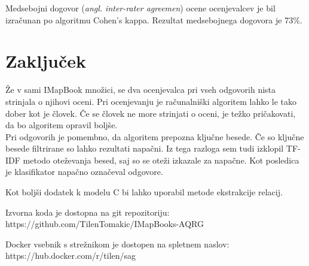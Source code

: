 \documentclass[journal]{IEEEtran}
\begin{document}
Medsebojni dogovor (\textit{angl. inter-rater agreemen}) ocene ocenjevalcev je bil izračunan po algoritmu Cohen's kappa. Rezultat medsebojnega dogovora je 73\%.

\section{Zaključek}
Že v sami IMapBook množici, se dva ocenjevalca pri vseh odgovorih nista strinjala o njihovi oceni. Pri ocenjevanju je računalniški algoritem lahko le tako dober kot je človek. Če se človek ne more strinjati o oceni, je težko pričakovati, da bo algoritem opravil boljše.\\

Pri odgovorih je pomembno, da algoritem prepozna ključne besede. Če so ključne besede filtrirane so lahko rezultati napačni. Iz tega razloga sem tudi izklopil TF-IDF metodo oteževanja besed, saj so se oteži izkazale za napačne. Kot posledica je klasifikator napačno označeval odgovore.

Kot boljši dodatek k modelu C bi lahko uporabil metode ekstrakcije relacij.

Izvorna koda je dostopna na git repozitoriju: https://github.com/TilenTomakic/IMapBooks-AQRG

Docker vsebnik s strežnikom je dostopen na spletnem naslov:
https://hub.docker.com/r/tilen/sag

\ifCLASSOPTIONcaptionsoff
  \newpage
\fi



\end{document}
